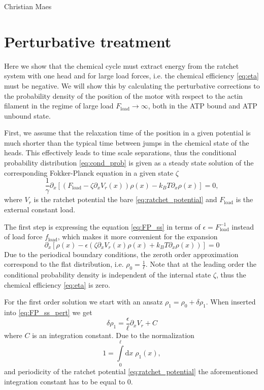 \documentclass[aps,pre,twocolumn,showpacs,showkeys,superscriptaddress,floatfix]{revtex4-1}
\newcommand{\rmd}{{\mathrm d}}
\begin{document}
\begin{acknowledgments}
Christian Maes
\end{acknowledgments}

\appendix* 
\section{Perturbative treatment}
\label{sec:perturb}
Here we show that the chemical cycle must extract energy from the ratchet system with one head and for large load forces, 
i.e. the chemical efficiency \eqref{eq:eta} must be negative. 
We will show this by calculating the perturbative corrections to the probability density of the position of the motor with respect to the actin filament in the regime of large load $F_\text{load} \to \infty$, both in the ATP bound and ATP unbound state. 

First, we assume that the relaxation time of the position in a given potential is much shorter than the typical time between jumps in the chemical state of the heads. 
This effectively leads to time scale separations,
thus the conditional probability distribution \eqref{eq:cond_prob} is given as a steady state solution of the corresponding Fokker-Planck equation in a given state $\zeta$
\begin{equation}
\frac{1}{\gamma} \partial_x \left[ \left( F_\text{load} - \zeta \partial_x V_r(x) \right) \rho(x) - k_B T \partial_x \rho(x) \right] = 0 ,
\label{eq:FP_ss}
\end{equation}
where $V_r$ is the ratchet potential the bare \eqref{eq:ratchet_potential} and $F_\text{load}$ is the external constant load. 

The first step is expressing the equation \eqref{eq:FP_ss} in terms of $\epsilon = F_\text{load}^{-1}$ instead of load force $f_\text{load}$,
which makes it more convenient for the expansion
\begin{equation}
\partial_x \left[ \rho(x) - \epsilon \left( \zeta \partial_x V_r(x) \rho(x) + k_B T \partial_x \rho(x) \right) \right] = 0 
\label{eq:FP_ss_pert}
\end{equation}
Due to the periodical boundary conditions, the zeroth order approximation correspond to the flat distribution, i.e. $\rho_0 = \frac{1}{\ell}$. 
Note that at the leading order the conditional probability density is independent of the internal state $\zeta$,
thus the chemical efficiency \eqref{eq:eta} is zero. 

For the first order solution we start with an ansatz $\rho_1 = \rho_0 + \delta\rho_1$. 
When inserted into \eqref{eq:FP_ss_pert} we get
\begin{equation*}
\delta\rho_1 = \frac{\epsilon}{\ell} \partial_x V_r + C
\end{equation*}
where $C$ is an integration constant.
Due to the normalization 
\begin{equation}
1 = \int\limits_0^\ell \rmd x \; \rho_1(x), 
\label{eq:normalization}
\end{equation}
and periodicity of the ratchet potential \eqref{eq:ratchet_potential} the aforementioned integration constant has to be equal to $0$.
\end{document}
